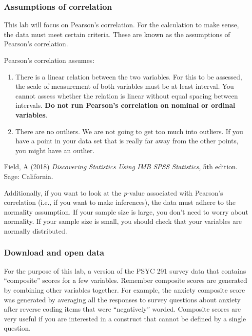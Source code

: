 \documentclass[
]{book}
\begin{document}
\hypertarget{assumptions-of-correlation}{%
\subsubsection{Assumptions of correlation}\label{assumptions-of-correlation}}

This lab will focus on Pearson's correlation. For the calculation to make sense, the data must meet certain criteria. These are known as the assumptions of Pearson's correlation.

Pearson's correlation assumes:

\begin{enumerate}
\def\labelenumi{\arabic{enumi}.}
\item
  There is a linear relation between the two variables. For this to be assessed, the scale of measurement of both variables must be at least interval. You cannot assess whether the relation is linear without equal spacing between intervals. \textbf{Do not run Pearson's correlation on nominal or ordinal variables}.
\item
  There are no outliers. We are not going to get too much into outliers. If you have a point in your data set that is really far away from the other points, you might have an outlier.
\end{enumerate}

Field, A (2018) \emph{Discovering Statistics Using IMB SPSS Statistics}, 5th edition. Sage: California.

Additionally, if you want to look at the \emph{p}-value associated with Pearson's correlation (i.e., if you want to make inferences), the data must adhere to the normality assumption. If your sample size is large, you don't need to worry about normality. If your sample size is small, you should check that your variables are normally distributed.

\hypertarget{download-and-open-data}{%
\subsubsection{Download and open data}\label{download-and-open-data}}

For the purpose of this lab, a version of the PSYC 291 survey data that contains ``composite'' scores for a few variables. Remember composite scores are generated by combining other variables together. For example, the anxiety composite score was generated by averaging all the responses to survey questions about anxiety after reverse coding items that were ``negatively'' worded. Composite scores are very useful if you are interested in a construct that cannot be defined by a single question.
\end{document}

